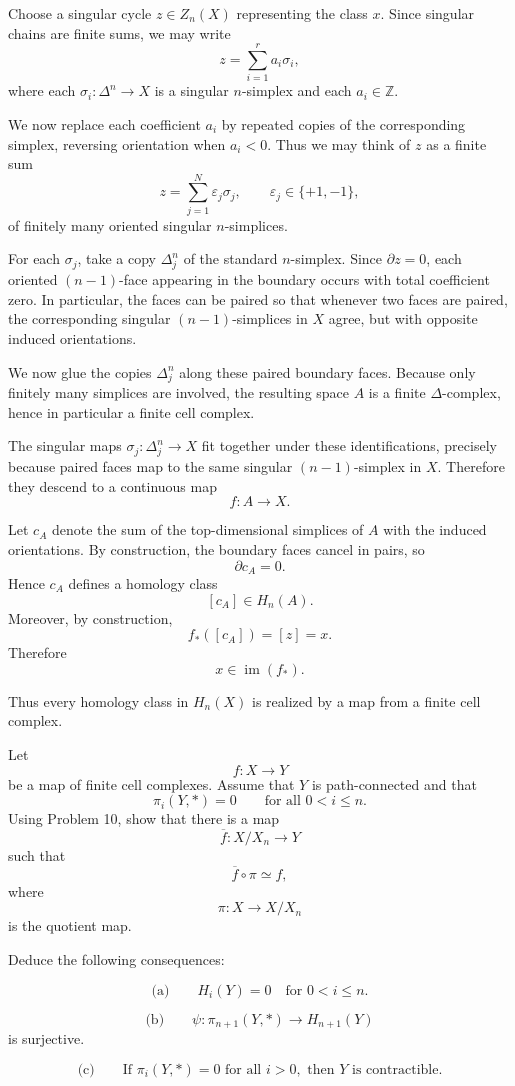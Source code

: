 \begin{solution}
Choose a singular cycle \(z\in Z_n(X)\) representing the class \(x\). Since singular chains are finite sums, we may write
\[
z=\sum_{i=1}^r a_i\sigma_i,
\]
where each \(\sigma_i:\Delta^n\to X\) is a singular \(n\)-simplex and each \(a_i\in \mathbb Z\).

We now replace each coefficient \(a_i\) by repeated copies of the corresponding simplex, reversing orientation when \(a_i<0\). Thus we may think of \(z\) as a finite sum
\[
z=\sum_{j=1}^N \varepsilon_j \sigma_j,
\qquad \varepsilon_j\in\{+1,-1\},
\]
of finitely many oriented singular \(n\)-simplices.

For each \(\sigma_j\), take a copy \(\Delta_j^n\) of the standard \(n\)-simplex. Since \(\partial z=0\), each oriented \((n-1)\)-face appearing in the boundary occurs with total coefficient zero. In particular, the faces can be paired so that whenever two faces are paired, the corresponding singular \((n-1)\)-simplices in \(X\) agree, but with opposite induced orientations.

We now glue the copies \(\Delta_j^n\) along these paired boundary faces. Because only finitely many simplices are involved, the resulting space \(A\) is a finite \(\Delta\)-complex, hence in particular a finite cell complex.

The singular maps \(\sigma_j:\Delta_j^n\to X\) fit together under these identifications, precisely because paired faces map to the same singular \((n-1)\)-simplex in \(X\). Therefore they descend to a continuous map
\[
f:A\to X.
\]

Let \(c_A\) denote the sum of the top-dimensional simplices of \(A\) with the induced orientations. By construction, the boundary faces cancel in pairs, so
\[
\partial c_A=0.
\]
Hence \(c_A\) defines a homology class
\[
[c_A]\in H_n(A).
\]
Moreover, by construction,
\[
f_*([c_A])=[z]=x.
\]
Therefore
\[
x\in \operatorname{im}(f_*).
\]

\par

Thus every homology class in \(H_n(X)\) is realized by a map from a finite cell complex.

\par
\end{solution}

\begin{problem}
Let
\[
f:X\to Y
\]
be a map of finite cell complexes. Assume that \(Y\) is path-connected and that
\[
\pi_i(Y,*)=0
\qquad
\text{for all }0<i\leq n.
\]
Using Problem 10, show that there is a map
\[
\overline f:X/X_n\to Y
\]
such that
\[
\overline f\circ \pi\simeq f,
\]
where
\[
\pi:X\to X/X_n
\]
is the quotient map.

Deduce the following consequences:

\[
\text{(a)}\qquad H_i(Y)=0
\quad
\text{for }0<i\leq n.
\]

\[
\text{(b)}\qquad
\psi:\pi_{n+1}(Y,*)\to H_{n+1}(Y)
\]
is surjective.

\[
\text{(c)}\qquad
\text{If }\pi_i(Y,*)=0\text{ for all }i>0,\text{ then }Y\text{ is contractible.}
\]
\end{problem}

